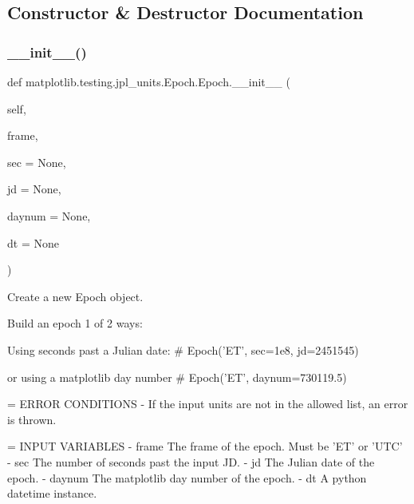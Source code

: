 \subsection{Constructor \& Destructor Documentation}
\mbox{\label{classmatplotlib_1_1testing_1_1jpl__units_1_1Epoch_1_1Epoch_ad9f3b16f399f3901ae191d03cdd8d5e9}} 
\subsubsection{\texorpdfstring{\+\_\+\+\_\+init\+\_\+\+\_\+()}{\_\_init\_\_()}}
{\footnotesize\ttfamily def matplotlib.\+testing.\+jpl\+\_\+units.\+Epoch.\+Epoch.\+\_\+\+\_\+init\+\_\+\+\_\+ (\begin{DoxyParamCaption}\item[{}]{self,  }\item[{}]{frame,  }\item[{}]{sec = {\ttfamily None},  }\item[{}]{jd = {\ttfamily None},  }\item[{}]{daynum = {\ttfamily None},  }\item[{}]{dt = {\ttfamily None} }\end{DoxyParamCaption})}

\begin{DoxyVerb}Create a new Epoch object.

Build an epoch 1 of 2 ways:

Using seconds past a Julian date:
#   Epoch('ET', sec=1e8, jd=2451545)

or using a matplotlib day number
#   Epoch('ET', daynum=730119.5)

= ERROR CONDITIONS
- If the input units are not in the allowed list, an error is thrown.

= INPUT VARIABLES
- frame     The frame of the epoch.  Must be 'ET' or 'UTC'
- sec        The number of seconds past the input JD.
- jd         The Julian date of the epoch.
- daynum    The matplotlib day number of the epoch.
- dt         A python datetime instance.
\end{DoxyVerb}
 

